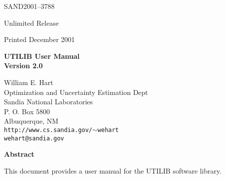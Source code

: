 \documentclass[10pt]{article}
\begin{document}
\pagestyle{empty}
\setcounter{page}{2}


\begin{center}
SAND2001--3788

Unlimited Release

Printed December 2001
\end{center}

\vspace{0.8in}

\begin{center}
{\bf \LARGE UTILIB User Manual\\[1ex]\Large Version 2.0}
\vspace*{0.4in}

William E. Hart\\
Optimization and Uncertainty Estimation Dept\\
Sandia National Laboratories\\
P. O. Box 5800\\
Albuquerque, NM\\
{\tt http://www.cs.sandia.gov/$\sim$wehart}\\
{\tt wehart@sandia.gov}\\

\vspace*{1.0in}

{\bf\large Abstract}
\end{center}
This document provides a user manual for the UTILIB software library.


\vfill
\newpage

\tableofcontents

\clearemptydoublepage
{}



\newpage


\newpage



\end{document}
